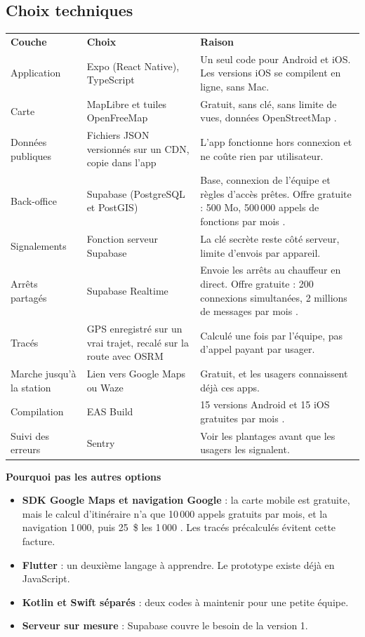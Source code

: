 \documentclass[11pt,a4paper]{article}
\newcommand{\hd}[1]{\textbf{\color{white}#1}}
\newcommand{\hdrow}{\rowcolor{brand}}
\begin{document}
\subsection{Choix techniques}
\begin{xltabular}{\textwidth}{@{}P{2.7cm} P{4.1cm} Y@{}}
\hdrow \hd{Couche} & \hd{Choix} & \hd{Raison} \\
Application & Expo (React Native), TypeScript & Un seul code pour Android et iOS. Les versions iOS se compilent en ligne, sans Mac. \\
Carte & MapLibre et tuiles OpenFreeMap & Gratuit, sans clé, sans limite de vues, données OpenStreetMap \cite{openfreemap}. \\
Données publiques & Fichiers JSON versionnés sur un CDN, copie dans l'app & L'app fonctionne hors connexion et ne coûte rien par utilisateur. \\
Back-office & Supabase (PostgreSQL et PostGIS) & Base, connexion de l'équipe et règles d'accès prêtes. Offre gratuite : 500 Mo, 500\,000 appels de fonctions par mois \cite{supabase}. \\
Signalements & Fonction serveur Supabase & La clé secrète reste côté serveur, limite d'envois par appareil. \\
Arrêts partagés & Supabase Realtime & Envoie les arrêts au chauffeur en direct. Offre gratuite : 200 connexions simultanées, 2 millions de messages par mois \cite{supabase}. \\
Tracés & GPS enregistré sur un vrai trajet, recalé sur la route avec OSRM & Calculé une fois par l'équipe, pas d'appel payant par usager. \\
Marche jusqu'à la station & Lien vers Google Maps ou Waze & Gratuit, et les usagers connaissent déjà ces apps. \\
Compilation & EAS Build & 15 versions Android et 15 iOS gratuites par mois \cite{expo}. \\
Suivi des erreurs & Sentry & Voir les plantages avant que les usagers les signalent. \\
\end{xltabular}

\textbf{Pourquoi pas les autres options}
\begin{itemize}
\item \textbf{SDK Google Maps et navigation Google} : la carte mobile est gratuite, mais le calcul d'itinéraire n'a que 10\,000 appels gratuits par mois, et la navigation 1\,000, puis 25~\$ les 1\,000 \cite{gmaps}. Les tracés précalculés évitent cette facture.
\item \textbf{Flutter} : un deuxième langage à apprendre. Le prototype existe déjà en JavaScript.
\item \textbf{Kotlin et Swift séparés} : deux codes à maintenir pour une petite équipe.
\item \textbf{Serveur sur mesure} : Supabase couvre le besoin de la version 1.
\end{itemize}
\end{document}
